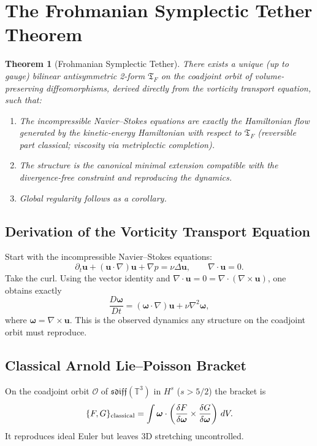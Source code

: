 \documentclass[11pt,a4paper]{article}
\newtheorem{theorem}{Theorem}
\begin{document}
\section{The Frohmanian Symplectic Tether Theorem}

\begin{theorem}[Frohmanian Symplectic Tether]
There exists a unique (up to gauge) bilinear antisymmetric 2-form \(\mathfrak{T}_F\) on the coadjoint orbit of volume-preserving diffeomorphisms, derived directly from the vorticity transport equation, such that:
\begin{enumerate}
\item The incompressible Navier--Stokes equations are exactly the Hamiltonian flow generated by the kinetic-energy Hamiltonian with respect to \(\mathfrak{T}_F\) (reversible part classical; viscosity via metriplectic completion).
\item The structure is the canonical minimal extension compatible with the divergence-free constraint and reproducing the dynamics.
\item Global regularity follows as a corollary.
\end{enumerate}
\end{theorem}

\subsection{Derivation of the Vorticity Transport Equation}

Start with the incompressible Navier--Stokes equations:
\[
\partial_t \mathbf{u} + (\mathbf{u} \cdot \nabla)\mathbf{u} + \nabla p = \nu \Delta \mathbf{u}, \qquad \nabla \cdot \mathbf{u} = 0.
\]
Take the curl. Using the vector identity and \(\nabla \cdot \mathbf{u} = 0 = \nabla \cdot (\nabla \times \mathbf{u})\), one obtains exactly
\[
\frac{D \boldsymbol{\omega}}{Dt} = (\boldsymbol{\omega} \cdot \nabla) \mathbf{u} + \nu \nabla^2 \boldsymbol{\omega},
\]
where \(\boldsymbol{\omega} = \nabla \times \mathbf{u}\). This is the observed dynamics any structure on the coadjoint orbit must reproduce.

\subsection{Classical Arnold Lie--Poisson Bracket}

On the coadjoint orbit \(\mathcal{O}\) of \(\mathfrak{sdiff}(\mathbb{T}^3)\) in \(H^s\) (\(s > 5/2\)) the bracket is
\[
\{F, G\}_{\rm classical} = \int \boldsymbol{\omega} \cdot \left( \frac{\delta F}{\delta \boldsymbol{\omega}} \times \frac{\delta G}{\delta \boldsymbol{\omega}} \right) \, dV.
\]
It reproduces ideal Euler but leaves 3D stretching uncontrolled.
\end{document}
